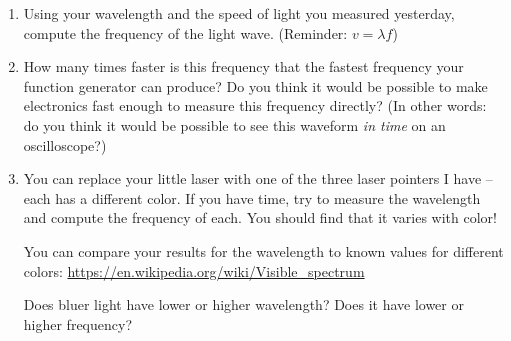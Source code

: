 \documentclass[12pt, letterpaper]{article}
\begin{document}
\begin{enumerate}
	\answergrid{5cm}
	\item Using your wavelength and the speed of light you measured yesterday, compute the frequency of the light wave.
	(Reminder: $v = \lambda f$)
	
	\fillanswergrid
	\item How many times faster is this frequency that the fastest frequency your function generator can produce?  
	Do you think it would be possible to make electronics fast enough to measure this frequency directly?
	(In other words: do you think it would be possible to see this waveform \emph{in time} on an oscilloscope?)
	
	\answergrid{5cm}
	
	\item You can replace your little laser with one of the three laser pointers I have -- each has a different color.  
	If you have time, try to measure the wavelength and compute the frequency of each.
	You should find that it varies with color!
	
	You can compare your results for the wavelength to known values for different colors: \url{https://en.wikipedia.org/wiki/Visible_spectrum}
	
	Does bluer light have lower or higher wavelength?  Does it have lower or higher frequency?
	
	\fillanswergrid
	
	
\end{enumerate}
\end{document}
